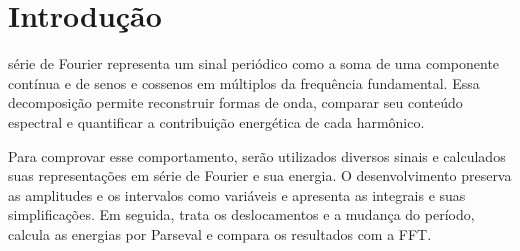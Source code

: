 \section{Introdução}

 série de Fourier representa um sinal periódico como a soma de uma
componente contínua e de senos e cossenos em múltiplos da frequência
fundamental. Essa decomposição permite reconstruir formas de onda,
comparar seu conteúdo espectral e quantificar a contribuição energética
de cada harmônico.

Para comprovar esse comportamento, serão utilizados diversos sinais e calculados
suas representações em série de Fourier e sua energia. O desenvolvimento
preserva as amplitudes e os intervalos como variáveis e apresenta as
integrais e suas simplificações. Em seguida, trata os deslocamentos e a
mudança do período, calcula as energias por Parseval e compara os
resultados com a FFT. 

